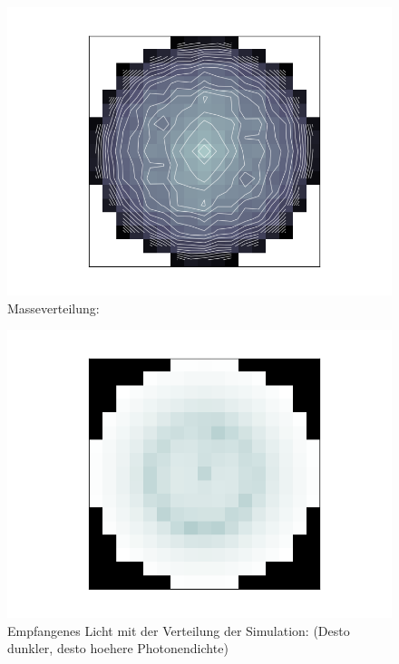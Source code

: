 \documentclass[pdftex,12pt,a4paper]{article}
\begin{document}
\begin{figure}[position=h]
\centering
 \caption{Masseverteilung:}
 \includegraphics[width=12cm]{Bilder/workoutput3}%
\end{figure}

\begin{figure}[position=h]
\centering
 \caption{Empfangenes Licht mit der Verteilung der Simulation:\newline
  (Desto dunkler, desto hoehere Photonendichte)}
 \includegraphics[width=12cm]{Bilder/workoutput2}%
\end{figure}
\end{document}
